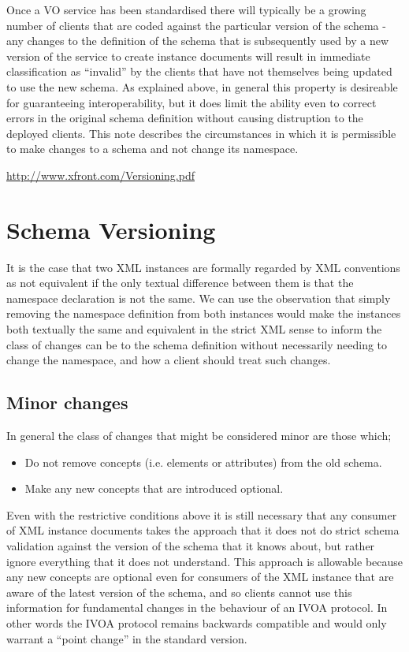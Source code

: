\documentclass[10pt,a4paper]{ivoa}
\begin{document}
Once a VO service has been standardised there will typically be a growing number
of clients that are coded against the particular version of the
schema - any changes to the definition of the schema that is subsequently used
by a new version of the service to create instance documents will result in
immediate classification as ``invalid'' by the clients that have not themselves being
updated to use the new schema.
As explained above, in general this property is desireable for guaranteeing interoperability, but it does limit
the ability even to correct errors in the original schema definition without
causing distruption to the deployed clients. This note describes the
circumstances in which it is permissible to make changes to a schema and not
change its namespace.

\url{http://www.xfront.com/Versioning.pdf}


\section{Schema Versioning}
It is the case that two XML instances are formally regarded by XML
conventions as not equivalent if the only textual difference between them is
that the namespace declaration is not the same. We
can use the observation that simply removing the namespace definition from both instances
would make the instances both textually the same and equivalent in the strict
XML sense to inform the class of changes can be to the schema definition without
necessarily needing to change the namespace, and how a client should treat such
changes.
\subsection{Minor changes}
In general the class of changes that might be considered minor are those which; 
\begin{itemize}
  \item Do not remove concepts (i.e. elements or attributes) from the old
  schema.
  \item Make any new concepts that are introduced optional.
\end{itemize}
Even with the restrictive conditions above it is still necessary that any
consumer of XML instance documents takes the approach that it does not do strict
schema validation against the version of the schema that it knows about, but
rather ignore everything that it does not understand. This approach is allowable
because any new concepts are optional even for consumers of the XML instance
that are aware of the latest version of the schema, and so clients cannot use
this information for fundamental changes in the behaviour of an IVOA protocol.
In other words the IVOA protocol remains backwards compatible and would only
warrant a ``point change'' in the standard version.
\end{document}
